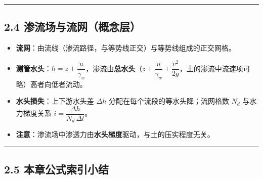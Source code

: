 \documentclass[
]{article}
\providecommand{\tightlist}{%
  \setlength{\itemsep}{0pt}\setlength{\parskip}{0pt}}
\begin{document}
\begin{center}\rule{0.5\linewidth}{0.5pt}\end{center}

\subsection{2.4
渗流场与流网（概念层）}\label{ux6e17ux6d41ux573aux4e0eux6d41ux7f51ux6982ux5ff5ux5c42}

\begin{itemize}
\tightlist
\item
  \textbf{流网}：由流线（渗流路径，与等势线正交）与等势线组成的正交网格。
\item
  \textbf{测管水头}：\(h= z + \dfrac{u}{\gamma_w}\)，渗流由\textbf{总水头}（\(z+\dfrac{u}{\gamma_w}+\dfrac{v^2}{2g}\)，土的渗流中流速项可略）高者向低者流动。
\item
  \textbf{水头损失}：上下游水头差 \(\Delta h\)
  分配在每个流段的等水头降；流网格数 \(N_d\) 与水力梯度关系
  \(i=\dfrac{\Delta h}{N_d\,\Delta l}\)。
\item
  \textbf{注意}：渗流场中渗透力由\textbf{水头梯度}驱动，与土的压实程度无关。
\end{itemize}

\begin{center}\rule{0.5\linewidth}{0.5pt}\end{center}

\subsection{2.5
本章公式索引小结}\label{ux672cux7ae0ux516cux5f0fux7d22ux5f15ux5c0fux7ed3}
\end{document}

